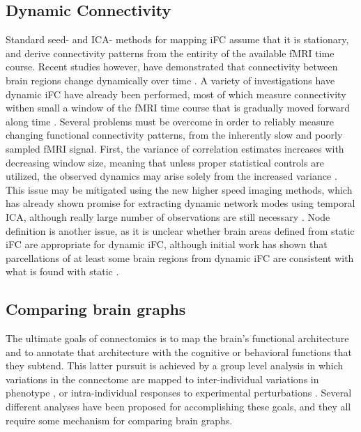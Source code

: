 \subsection{Dynamic Connectivity}

Standard seed- and ICA- methods for mapping iFC assume that it is stationary,
and derive connectivity patterns from the entirity of the available fMRI time
course. Recent studies however, have demonstrated that connectivity between
brain regions change dynamically over time \cite{Chang, Keilholz,
Hutchinson2013, Fu2013, Zhen}. A variety of investigations have dynamic iFC have
already been performed, most of which measure connectivity withen small a
window of the fMRI time course that is gradually moved forward along time
\cite{}. Several problems must be overcome in order to reliably measure
changing functional connectivity patterns, from the inherently slow and poorly
sampled fMRI signal. First, the variance of correlation estimates increases
with decreasing window size, meaning that unless proper statistical controls
are utilized, the observed dynamics may arise solely from the increased
variance \cite{}. This issue may be mitigated using the new higher speed
imaging methods, which has already shown promise for extracting dynamic network
modes using temporal ICA, although really large number of observations are
still necessary \cite{Smith2012}. Node definition is another
issue, as it is unclear whether brain areas defined from static iFC are
appropriate for dynamic iFC, although initial work has shown that parcellations
of at least some brain regions from dynamic iFC are consistent with what is
found with static \cite{Yang2013}.

\subsection{Comparing brain graphs} 

The ultimate goals of connectomics is to map the brain's functional
architecture and to annotate that architecture with the cognitive or behavioral
functions that they subtend. This latter pursuit is achieved by a group level
analysis in which variations in the connectome are mapped to inter-individual
variations in phenotype \cite{Kelly2011}, or intra-individual responses to
experimental perturbations \cite{Shirer}. Several different analyses have been
proposed for accomplishing these goals, and they all require some mechanism for
comparing brain graphs. 
 
